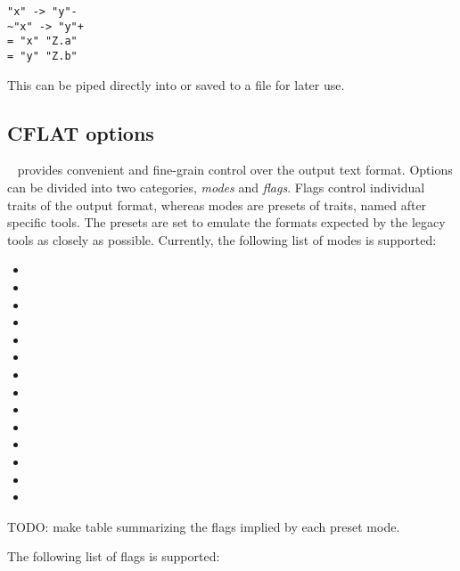 \begin{verbatim}
"x" -> "y"-
~"x" -> "y"+
= "x" "Z.a"
= "y" "Z.b"
\end{verbatim}

This can be piped directly into  or saved to a file for later use.  

\subsection{CFLAT options}
\label{sec:legacy:cflat:options}

\binhackt\  provides convenient and fine-grain control
over the output text format.  
Options can be divided into two categories, \emph{modes} and \emph{flags}.  
Flags control individual traits of the output format, 
whereas modes are presets of traits, named after specific tools. 
The presets are set to emulate the formats expected by the legacy tools
as closely as possible.  
Currently, the following list of modes is supported:

\begin{itemize}
\item {}
\item {}
\item {}
\item {}
\item {}
\item {}
\item {}
\item {}
\item {}
\item {}
\item {}
\item {}
\item {}
\item {}
\end{itemize}

TODO: make table summarizing the flags implied by each preset mode.  

The following list of flags is supported:


